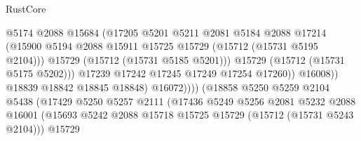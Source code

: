 \begin{lexlean}{RustCore}
\begin{coremodule}
                                            @5174
                                            @2088
                                            @15684
                                            (@17205
                                              @5201
                                              @5211
                                              @2081
                                              @5184
                                              @2088
                                              @17214
                                              (@15900
                                                @5194
                                                @2088
                                                @15911
                                                @15725
                                                @15729
                                                (@15712 (@15731 @5195 @2104)))
                                              @15729
                                              (@15712 (@15731 @5185 @5201)))
                                            @15729
                                            (@15712 (@15731 @5175 @5202)))
                                          @17239
                                          @17242
                                          @17245
                                          @17249
                                          @17254
                                          @17260))
                                      @16008))
                                  @18839
                                  @18842
                                  @18845
                                  @18848)
                                @16072))))
                        (@18858
                          @5250
                          @5259
                          @2104
                          @5438
                          (@17429
                            @5250
                            @5257
                            @2111
                            (@17436
                              @5249
                              @5256
                              @2081
                              @5232
                              @2088
                              @16001
                              (@15693
                                @5242
                                @2088
                                @15718
                                @15725
                                @15729
                                (@15712 (@15731 @5243 @2104)))
                              @15729

\end{coremodule}
\end{lexlean}
